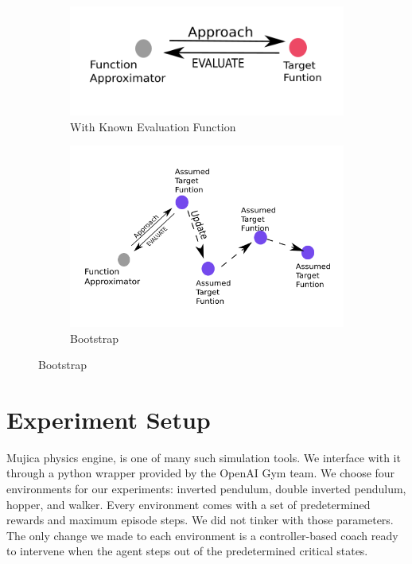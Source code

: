 \documentclass[journal]{IEEEtran}
\begin{document}
\begin{figure}
\centering
\begin{subfigure}{0.2\textwidth}
  \centering
  \includegraphics[width=\linewidth]{onego.png}
  \caption{With Known Evaluation Function}
  \label{fig:known}
\end{subfigure}%
\begin{subfigure}{.3\textwidth}
  \centering
  \includegraphics[width=\linewidth]{bootstrap.png}
  \caption{Bootstrap}
  \label{fig:unknown}
\end{subfigure}
\label{fig:bootstrap}
\end{figure}



\section{Experiment Setup}
Mujica physics engine\cite{6386109}, is one of many such simulation tools. We interface with it through a python wrapper provided by the OpenAI Gym\cite{Brockman2016OpenAIG} team. We choose four environments for our experiments: inverted pendulum, double inverted pendulum, hopper, and walker. Every environment comes with a set of predetermined rewards and maximum episode steps. We did not tinker with those parameters. The only change we made to each environment is a controller-based coach ready to intervene when the agent steps out of the predetermined critical states.
\end{document}
